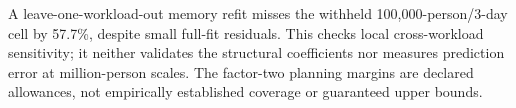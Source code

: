 A leave-one-workload-out memory refit misses the withheld 100,000-person/3-day cell by 57.7\%, despite small full-fit residuals. This checks local cross-workload sensitivity; it neither validates the structural coefficients nor measures prediction error at million-person scales. The factor-two planning margins are declared allowances, not empirically established coverage or guaranteed upper bounds.
